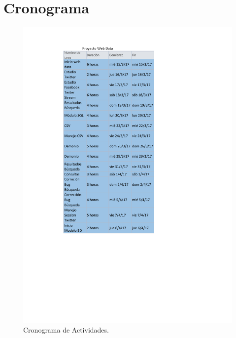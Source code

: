 \documentclass[12pt,letterpaper]{article}
\begin{document}
\section{Cronograma}
\begin{figure}[H]
\centering
\includegraphics{CronogramaOrdenDigital.pdf}
\caption{Cronograma de Actividades.}
\label{}
\end{figure}
\end{document}
